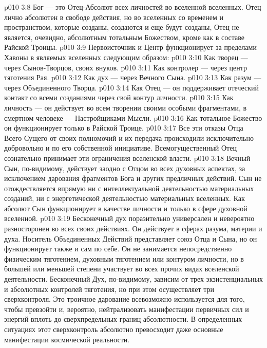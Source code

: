 \vs p010 3:8 Бог --- это Отец\hyp{}Абсолют всех личностей во вселенной вселенных. Отец лично абсолютен в свободе действия, но во вселенных со временем и пространством, которые созданы, создаются и еще будут созданы, Отец не является, очевидно, абсолютным тотальным Божеством, кроме как в составе Райской Троицы.
\vs p010 3:9 \pc Первоисточник и Центр функционирует за пределами Хавоны в являемых вселенных следующим образом:
\vs p010 3:10 \bibnobreakspace Как творец --- через Сынов\hyp{}Творцов, своих внуков.
\vs p010 3:11 \bibnobreakspace Как контролер --- через центр тяготения Рая.
\vs p010 3:12 \bibnobreakspace Как дух --- через Вечного Сына.
\vs p010 3:13 \bibnobreakspace Как разум --- через Объединенного Творца.
\vs p010 3:14 \bibnobreakspace Как Отец --- он поддерживает отеческий контакт со всеми созданиями через свой контур личности.
\vs p010 3:15 \bibnobreakspace Как личность --- он действует  во всем творении своими особыми фрагментами, в смертном человеке --- Настройщиками Мысли.
\vs p010 3:16 \bibnobreakspace Как тотальное Божество он функционирует только в Райской Троице.
\vs p010 3:17 \pc Все эти отказы Отца Всего Сущего от своих полномочий и их передача происходили исключительно добровольно и по его собственной инициативе. Всемогущественный Отец сознательно принимает эти ограничения вселенской власти.
\vs p010 3:18 \pc Вечный Сын, по\hyp{}видимому, действует заодно с Отцом во всех духовных аспектах, за исключением дарования фрагментов Бога и других предличных действий. Сын не отождествляется впрямую ни с интеллектуальной деятельностью материальных созданий, ни с энергетической деятельностью материальных вселенных. Как абсолют Сын функционирует в качестве личности и только в сфере духовной вселенной.
\vs p010 3:19 \pc Бесконечный дух поразительно универсален и невероятно разносторонен во всех своих действиях. Он действует в сферах разума, материи и духа. Носитель Объединенных Действий представляет союз Отца и Сына, но он функционирует также и сам по себе. Он не занимается непосредственно физическим тяготением, духовным тяготением или контуром личности, но в большей или меньшей степени участвует во всех прочих видах вселенской деятельности. Бесконечный Дух, по\hyp{}видимому, зависим от трех экзистенциальных и абсолютных контролей тяготения, но при этом осуществляет три сверхконтроля. Это троичное дарование всевозможно используется для того, чтобы превзойти и, вероятно, нейтрализовать манифестации первичных сил и энергий вплоть до сверхпредельных границ абсолютности. В определенных ситуациях этот сверхконтроль абсолютно превосходит даже основные манифестации космической реальности.
